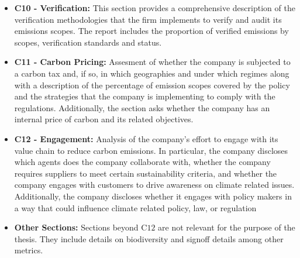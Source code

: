 \begin{itemize}
    \item \textbf{C10 - Verification:} This section provides a comprehensive description of the verification methodologies that the firm implements to verify and audit its emissions scopes. The report includes the proportion of verified emissions by scopes, verification standards and status.
    \item \textbf{C11 - Carbon Pricing:} Assesment of whether the company is subjected to a carbon tax and, if so, in which geographies and under which regimes along with a description of the percentage of emission scopes covered by the policy and the strategies that the company is implementing to comply with the regulations. Additionally, the section asks whether the company has an internal price of carbon and its related objectives.
    \item \textbf{C12 - Engagement:} Analysis of the company's effort to engage with its value chain to reduce carbon emissions. In particular, the company discloses which agents does the company collaborate with, whether the company requires suppliers to meet certain sustainability criteria, and whether the company engages with customers to drive awareness on climate related issues. Additionally, the company discloses whether it engages with policy makers in a way that could influence climate related policy, law, or regulation
    \item \textbf{Other Sections:} Sections beyond C$12$ are not relevant for the purpose of the thesis. They include details on biodiversity and signoff details among other metrics.
\end{itemize}

